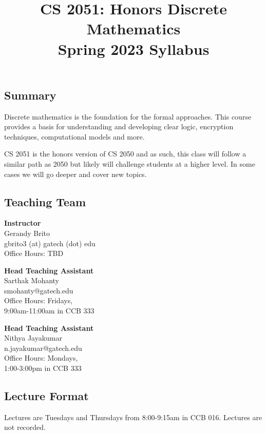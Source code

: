 \documentclass{article}
\title{\vspace{-1cm}CS 2051: Honors Discrete Mathematics \\Spring 2023 Syllabus\vspace{-1cm}}
\author{}
\date{}
\begin{document}
\maketitle

\subsection*{Summary}
    Discrete mathematics is the foundation for the formal approaches. This course provides a basis for understanding and developing clear logic, encryption techniques, computational models and more.
    
    \vspace{3mm}
    CS 2051 is the honors version of CS 2050 and as such, this class will follow a similar path as 2050 but likely will challenge students at a higher level. In some cases we will go deeper and cover new topics.

\subsection*{Teaching Team}
    \begin{multicols}{3}
        \textbf{Instructor} \\
        \noindent Gerandy Brito \\
        gbrito3 (at) gatech (dot) edu \\
        Office Hours: TBD

        \columnbreak

        \textbf{Head Teaching Assistant} \\
        Sarthak Mohanty \\
        smohanty@gatech.edu \\
        Office Hours: Fridays, \\
        9:00am-11:00am in CCB 333

        \columnbreak
        
        \textbf{Head Teaching Assistant} \\
        Nithya Jayakumar \\
        n.jayakumar@gatech.edu \\
        Office Hours: Mondays, \\
        1:00-3:00pm in CCB 333
    \end{multicols}

\subsection*{Lecture Format}
    Lectures are Tuesdays and Thursdays from 8:00-9:15am in CCB 016. Lectures are not recorded.
    
\end{document}
